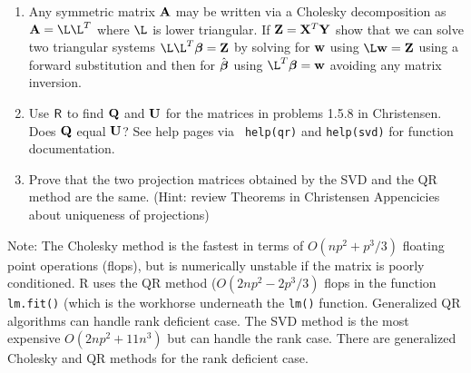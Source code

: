 \documentclass[12pt]{article}
\begin{document}
\begin{enumerate}
\begin{enumerate}
\item Any symmetric matrix $\mathbf{A}$ may be written via a Cholesky
  decomposition as $\A = \L \L^T$ where $\L$
  is lower triangular.   If $\mathbf{Z} = \mathbf{X}^T\mathbf{Y}$  show that we can solve two
  triangular systems $\L \L^T \b = \Z$ by solving for $\mathbf{w}$ using  $\L \w = \Z$ using a
  forward substitution and then for $\hat{\boldsymbol{\beta}}$ using $\L^T \b =
  \w$ avoiding any matrix inversion.

\item Use $\textsf{R}$ to find $\mathbf{Q}$ and $\mathbf{U}$ for the matrices in problems 1.5.8 in
  Christensen. Does $\mathbf{Q}$ equal $\mathbf{U}$?   See help pages via {\tt
    help(qr)} and {\tt help(svd)} for function documentation.
\item Prove that the two projection matrices obtained by the SVD and
  the QR method are the same.  (Hint:  review Theorems in Christensen
  Appencicies about uniqueness of projections)

  \end{enumerate}
  Note: The Cholesky method is the fastest in terms of
  $O(n p^2 + p^3/3)$ floating point operations (flops), but is
  numerically unstable if the matrix is poorly conditioned.  R uses
  the QR method ($O(2 n p^2 - 2p^3/3)$ flops in the function {\tt lm.fit()}
  (which is the workhorse underneath the {\tt lm()} function.  Generalized QR
  algorithms can handle rank deficient case.  The SVD method is the
  most expensive $O(2 n p^2 + 11 n^3)$ but can handle the rank case.
  There are generalized Cholesky and QR methods for the rank deficient
  case.
\end{enumerate}
\end{document}
